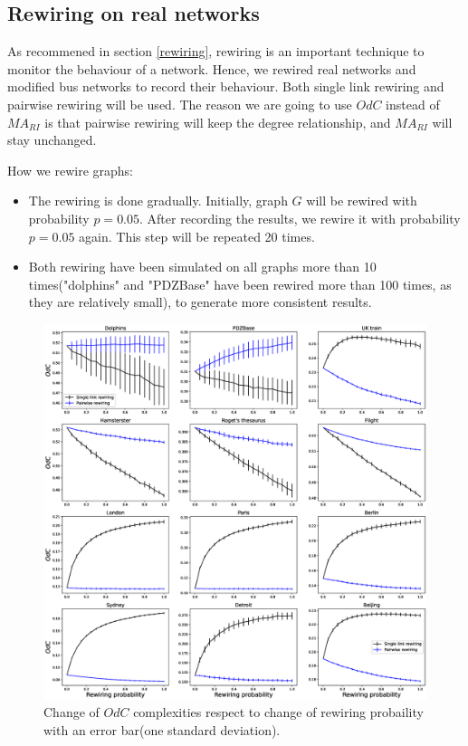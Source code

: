 \documentclass[12pt]{article}
\begin{document}
\subsection{Rewiring on real networks}
As recommened in section \ref{rewiring}, rewiring is an important technique to monitor the behaviour of a network. Hence, we rewired real networks and modified bus networks to record their behaviour. Both single link rewiring and pairwise rewiring will be used. The reason we are going to use $OdC$ instead of $MA_{RI}$ is that pairwise rewiring will keep the degree relationship, and $MA_{RI}$ will stay unchanged.\par
How we rewire graphs:
\begin{itemize}
    \item The rewiring is done gradually. Initially, graph $G$ will be rewired with probability $p=0.05$. After recording the results, we rewire it with probability $p=0.05$ again. This step will be repeated 20 times.
    \item Both rewiring have been simulated on all graphs more than 10 times("dolphins" and "PDZBase" have been rewired more than 100 times, as they are relatively small), to generate more consistent results.
\end{itemize}
\begin{figure}[ht]
    \centering
    \includegraphics[width=\textwidth]{rewiring.eps}
    \caption{Change of $OdC$ complexities respect to change of rewiring probaility with an error bar(one standard deviation).}
    \label{fig:rewiring}
\end{figure}
\end{document}
